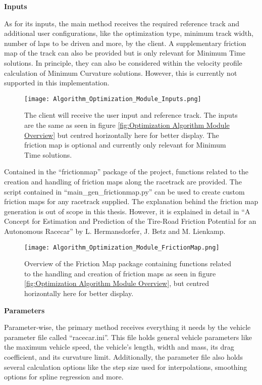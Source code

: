 \textbf{Inputs}

As for its inputs, the main method receives the required reference track and additional user configurations, like the optimization type, minimum track width, number of laps to be driven and more, by the client. A supplementary friction map of the track can also be provided but is only relevant for Minimum Time solutions. In principle, they can also be considered within the velocity profile calculation of Minimum Curvature solutions. However, this is currently not supported in this implementation. \cite{tumftm_optimization_algoritm}
\begin{figure}[H]
    \centering
    \texttt{[image: Algorithm\_Optimization\_Module\_Inputs.png]}
    \caption{The client will receive the user input and reference track. The inputs are the same as seen in figure \ref{fig:Optimization Algorithm Module Overview} but centred horizontally here for better display. The friction map is optional and currently only relevant for Minimum Time solutions.}
    \label{fig:Optimization Algorithm Module Inputs}
\end{figure}

Contained in the ``frictionmap'' package of the project, functions related to the creation and handling of friction maps along the racetrack are provided.
The script contained in ``main\_gen\_frictionmap.py'' can be used to create custom friction maps for any racetrack supplied. The explanation behind the friction map generation is out of scope in this thesis. However, it is explained in detail in ``A Concept for Estimation and Prediction of the Tire-Road Friction Potential for an Autonomous Racecar'' by L. Hermansdorfer, J. Betz and M. Lienkamp. \cite{friction_map_generation}
\begin{figure}[H]
    \centering
    \texttt{[image: Algorithm\_Optimization\_Module\_FrictionMap.png]}
    \caption{Overview of the Friction Map package containing functions related to the handling and creation of friction maps as seen in figure \ref{fig:Optimization Algorithm Module Overview}, but centred horizontally here for better display.}
\end{figure}

\textbf{Parameters}

Parameter-wise, the primary method receives everything it needs by the vehicle parameter file called ``racecar.ini''. This file holds general vehicle parameters like the maximum vehicle speed, the vehicle's length, width and mass, its drag coefficient, and its curvature limit. Additionally, the parameter file also holds several calculation options like the step size used for interpolations, smoothing options for spline regression and more.

